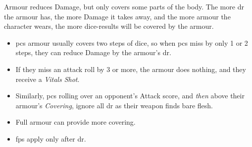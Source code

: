 Armour reduces Damage, but only covers some parts of the body.
The more \gls{dr} the armour has, the more Damage it takes away, and the more armour the character wears, the more dice-results will be covered by the armour. 

\begin{itemize}
  \item
  \Glspl{pc} armour usually covers two steps of dice, so when \glspl{pc} miss by only 1 or 2 steps, they can reduce Damage by the armour's \gls{dr}.
  \item
  If they miss an attack roll by 3 or more, the armour does nothing, and they receive a \textit{Vitals Shot}.
  \item
  Similarly, \glspl{pc} rolling over an opponent's Attack score, and \emph{then} above their armour's \textit{Covering}, ignore all \gls{dr} as their weapon finds bare flesh.
  \item
  Full armour can provide more covering.
  \item
  \Glspl{fp} apply only after \gls{dr}.
\end{itemize}
